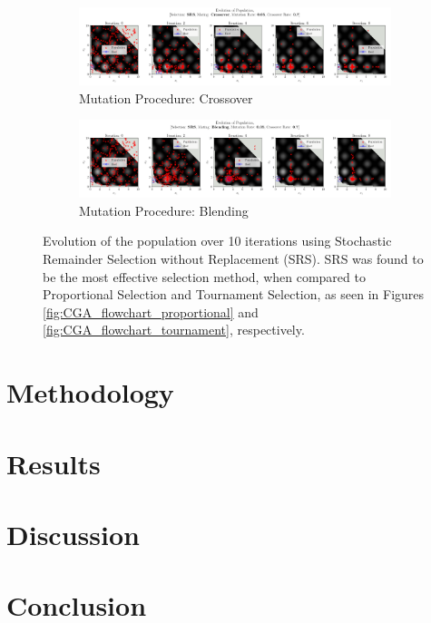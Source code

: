 \documentclass[10pt]{article}
\begin{document}
\begin{figure}[H]
    \centering
    \begin{subfigure}{\textwidth}
        \centering
        \includegraphics[width=\textwidth]{../figures/KBF/10_iters/SRS/Crossover/0.05_0.7_Population.png}
        \caption{Mutation Procedure: Crossover}
        \label{fig:CGA_flowchart_srs_crossover}
    \end{subfigure}
    \begin{subfigure}{\textwidth}
        \centering
        \includegraphics[width=\textwidth]{../figures/KBF/10_iters/SRS/Blending/0.05_0.7_Population.png}
        \caption{Mutation Procedure: Blending}
        \label{fig:CGA_flowchart_srs_blending}
    \end{subfigure}
    \captionsetup{justification=centering}
    \caption{Evolution of the population over 10 iterations using Stochastic Remainder Selection without Replacement (SRS). SRS was found to be the most effective selection method, when compared to Proportional Selection and Tournament Selection, as seen in Figures \ref{fig:CGA_flowchart_proportional} and \ref{fig:CGA_flowchart_tournament}, respectively.}
    \label{fig:CGA_flowchart_srs}
\end{figure}


\section{Methodology}
\section{Results}
\section{Discussion}
\section{Conclusion}

\newpage
\end{document}
